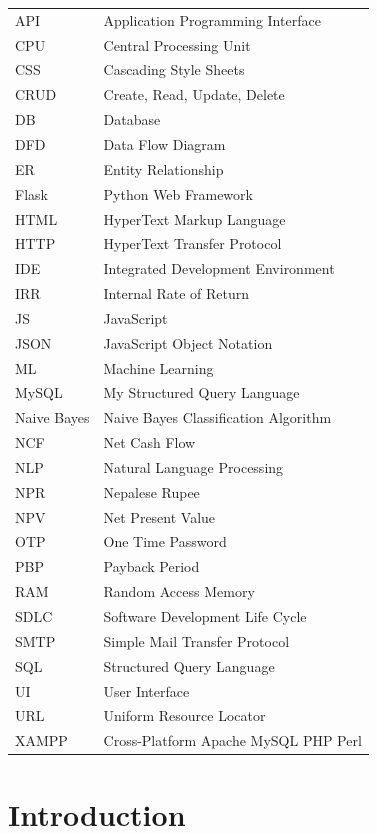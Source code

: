 \documentclass[12pt,a4paper]{report}
\begin{document}
\begin{longtable}{p{3cm}p{10cm}}
API & Application Programming Interface \\
CPU & Central Processing Unit \\
CSS & Cascading Style Sheets \\
CRUD & Create, Read, Update, Delete \\
DB & Database \\
DFD & Data Flow Diagram \\
ER & Entity Relationship \\
Flask & Python Web Framework \\
HTML & HyperText Markup Language \\
HTTP & HyperText Transfer Protocol \\
IDE & Integrated Development Environment \\
IRR & Internal Rate of Return \\
JS & JavaScript \\
JSON & JavaScript Object Notation \\
ML & Machine Learning \\
MySQL & My Structured Query Language \\
Naive Bayes & Naive Bayes Classification Algorithm \\
NCF & Net Cash Flow \\
NLP & Natural Language Processing \\
NPR & Nepalese Rupee \\
NPV & Net Present Value \\
OTP & One Time Password \\
PBP & Payback Period \\
RAM & Random Access Memory \\
SDLC & Software Development Life Cycle \\
SMTP & Simple Mail Transfer Protocol \\
SQL & Structured Query Language \\
UI & User Interface \\
URL & Uniform Resource Locator \\
XAMPP & Cross-Platform Apache MySQL PHP Perl \\
\end{longtable}

\chapter{Introduction}
\end{document}
